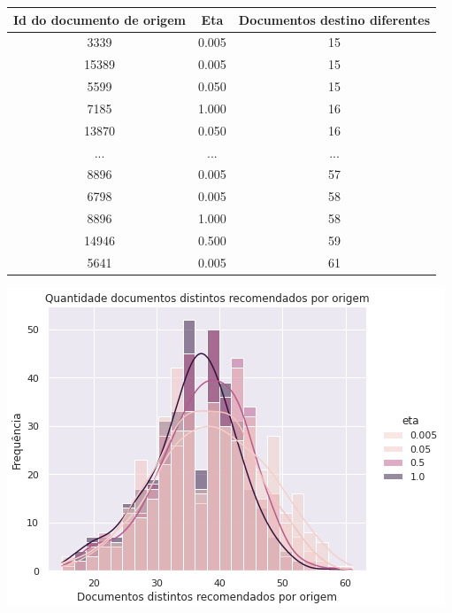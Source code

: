 \begin{center}
    \begin{tabular}{|c|c|c|}
        \hline
        Id do documento de origem & Eta & Documentos destino diferentes \\
        \hline
        3339 & 0.005 & 15 \\
        \hline
        15389 & 0.005 & 15 \\
        \hline
        5599 & 0.050 & 15 \\
        \hline
        7185 & 1.000 & 16 \\
        \hline
        13870 & 0.050 & 16 \\
        \hline
        ... & ... & ... \\
        \hline
        8896 & 0.005 & 57 \\
        \hline
        6798 & 0.005 & 58 \\
        \hline
        8896 & 1.000 & 58 \\
        \hline
        14946 & 0.500 & 59 \\
        \hline
        5641 & 0.005 & 61 \\
        \hline
    \end{tabular}
\end{center}

\includegraphics[scale=0.7]{resultados/resources/distribuicao_semelhantes_distintos_eta.png}


